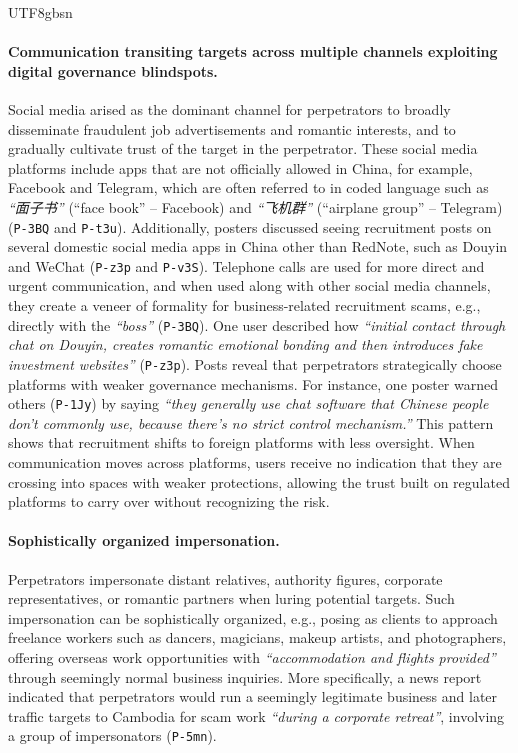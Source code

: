 \documentclass[sigconf,nonacm]{acmart}
\newcommand{\rev}[1]{#1}
\newcommand{\add}[1]{#1}
\begin{document}
\begin{CJK}{UTF8}{gbsn}
\paragraph{\textbf{\rev{Communication transiting targets across multiple channels exploiting digital governance blindspots.}}} Social media arised as the dominant channel for perpetrators to broadly disseminate fraudulent job advertisements and romantic interests, and to gradually cultivate trust of the target in the perpetrator. These social media platforms include apps that are not officially allowed in China, for example, Facebook and Telegram, which are often referred to in coded language such as \textit{``面子书''} (``face book'' -- Facebook) and \textit{``飞机群''} (``airplane group'' -- Telegram) (\texttt{P-3BQ} and \texttt{P-t3u}). Additionally, posters discussed seeing recruitment posts on several domestic social media apps in China other than RedNote, such as Douyin and WeChat (\texttt{P-z3p} and \texttt{P-v3S}). Telephone calls are used for more direct and urgent communication, and when used along with other social media channels, they create a veneer of formality for business-related recruitment scams, e.g., directly with the \textit{``boss''} (\texttt{P-3BQ}). \add{One user described how \textit{``initial contact through chat on Douyin, creates romantic emotional bonding and then introduces fake investment websites''} (\texttt{P-z3p}). Posts reveal that perpetrators strategically choose platforms with weaker governance mechanisms. For instance, one poster warned others (\texttt{P-1Jy}) by saying \textit{``they generally use chat software that Chinese people don't commonly use, because there's no strict control mechanism.''} This pattern shows that recruitment shifts to foreign platforms with less oversight. When communication moves across platforms, users receive no indication that they are crossing into spaces with weaker protections, allowing the trust built on regulated platforms to carry over without recognizing the risk.}

\paragraph{\textbf{Sophistically organized impersonation.}} Perpetrators impersonate distant relatives, authority figures, corporate representatives, or romantic partners when luring potential targets. Such impersonation can be sophistically organized, e.g., posing as clients to approach freelance workers such as dancers, magicians, makeup artists, and photographers, offering overseas work opportunities with \textit{``accommodation and flights provided''} through seemingly normal business inquiries. More specifically, a news report indicated that perpetrators would run a seemingly legitimate business and later traffic targets to Cambodia for scam work \textit{``during a corporate retreat''}, involving a group of impersonators (\texttt{P-5mn}).


\end{CJK}
\end{document}
